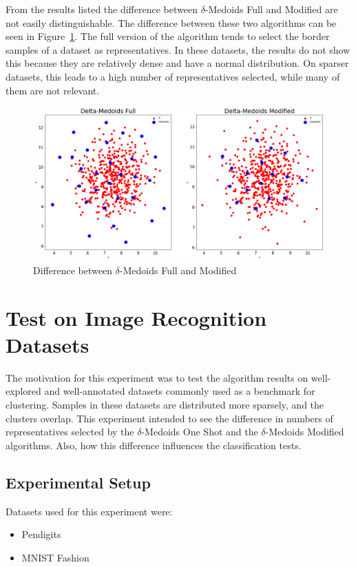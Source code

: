 \documentclass[thesis=B,english]{FITthesis}[2012/10/20]
\begin{document}
From the results listed the difference between $\delta$-Medoids Full and Modified are not easily distinguishable.
The difference between these two algorithms can be seen in Figure~\ref{img:difference_modified}.
The full version of the algorithm tends to select the border samples of a dataset as representatives.
In these datasets, the results do not show this because they are relatively dense and have a normal distribution.
On sparser datasets, this leads to a high number of representatives selected, while many of them are not relevant. 

\begin{figure}[H]
   \includegraphics[width=\linewidth]{img/delta_medoids_select.png}
  \caption{Difference between $\delta$-Medoids Full and Modified}
  \label{img:difference_modified}
\end{figure}

\newpage

\section{Test on Image Recognition Datasets}\label{sec:exp3}


The motivation for this experiment was to test the algorithm results on well-explored and well-annotated datasets commonly used as a benchmark for clustering.
Samples in these datasets are distributed more sparsely, and the clusters overlap.
This experiment intended to see the difference in numbers of representatives selected by the $\delta$-Medoids One Shot and the $\delta$-Medoids Modified algorithms.
Also,  how this difference influences the classification tests.

\subsection{Experimental Setup}
Datasets used for this experiment were:
\begin{itemize}
    \item Pendigits
    \item MNIST Fashion
\end{itemize}
\end{document}
